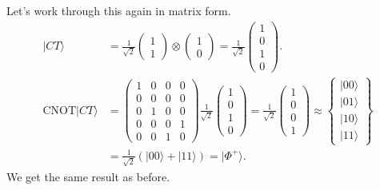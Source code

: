 \documentclass[a4paper, 11pt, normalem]{report}
\begin{document}
\begin{example}
    Let's work through this again in matrix form.
    \begin{align}
        |CT\rangle &= \frac{1}{\sqrt{2}}\begin{pmatrix} 1 \\ 1\end{pmatrix}\otimes\begin{pmatrix}1\\0\end{pmatrix} = \frac{1}{\sqrt{2}}\begin{pmatrix} 1\\0\\1\\0\end{pmatrix}. \\
        \text{CNOT}|CT\rangle &= \begin{pmatrix} 1 & 0 & 0 & 0 \\ 0 & 0 & 0 & 0 \\ 0 & 1 & 0 & 0 \\ 0 & 0 & 0 & 1 \\ 0 & 0 & 1 & 0 \end{pmatrix}\frac{1}{\sqrt{2}}\begin{pmatrix}1\\0\\1\\0\end{pmatrix}= \frac{1}{\sqrt{2}}\begin{pmatrix}1\\0\\0\\1\end{pmatrix} \approx \begin{Bmatrix} |00\rangle \\ |01\rangle \\ |10\rangle \\ |11\rangle\end{Bmatrix} \\
                              &= \frac{1}{\sqrt{2}}\left(|00\rangle+|11\rangle\right) = |\Phi^+\rangle.
    \end{align}
    We get the same result as before.
\end{example}
\end{document}
